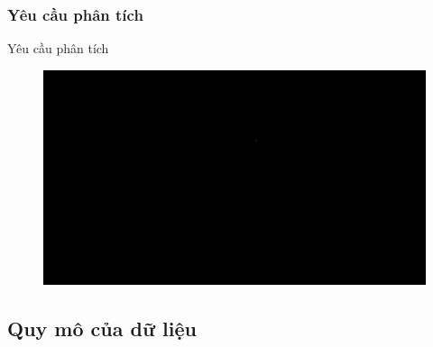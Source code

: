 \documentclass{beamer}
\begin{document}
\subsubsection{Yêu cầu phân tích}
\begin{frame}{Yêu cầu phân tích}
\begin{figure}[H]
\centering
\includegraphics[scale = 0.3]{pictures/black.png}
\end{figure}
\end{frame}
\subsection{Quy mô của dữ liệu}
\end{document}
